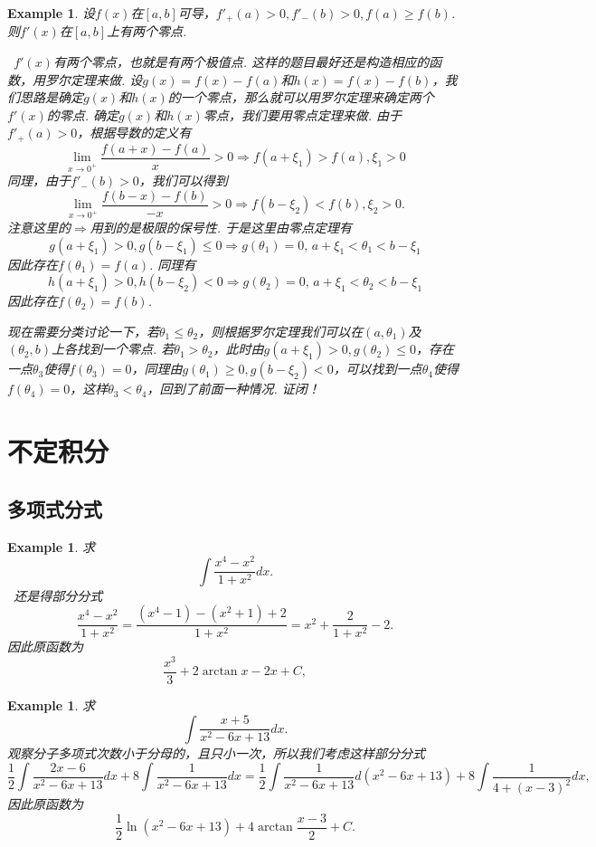 \documentclass{article}
\newtheorem{example}[theorem]{Example}
\newcommand{\hints}{{\color{blue} \text{hints}}}
\begin{document}
\begin{example}
\rm 设$f(x)$在$[a,b]$可导，$f'_+(a) > 0, f'_-(b) > 0, f(a) \geq f(b)$. 则$f'(x)$在$[a,b]$上有两个零点. 

\hints\ $f'(x)$有两个零点，也就是有两个极值点. 这样的题目最好还是构造相应的函数，用罗尔定理来做. 设$g(x) = f(x)-f(a)$和$h(x)=f(x)-f(b)$，我们思路是确定$g(x)$和$h(x)$的一个零点，那么就可以用罗尔定理来确定两个$f'(x)$的零点. 确定$g(x)$和$h(x)$零点，我们要用零点定理来做. 由于$f'_+(a) > 0$，根据导数的定义有
$$
\lim\limits_{x \to 0^+} \frac{f(a+x)-f(a)}{x} > 0 \Rightarrow f(a + \xi_1) > f(a),\xi_1 > 0
$$  
同理，由于$f'_-(b) > 0$，我们可以得到
$$
\lim\limits_{x \to 0^+} \frac{f(b-x)-f(b)}{-x} > 0 \Rightarrow f(b - \xi_2) < f(b), \xi_2 > 0.
$$
注意这里的$\Rightarrow$用到的是极限的保号性. 于是这里由零点定理有
$$
g(a + \xi_1) > 0, g(b-\xi_1) \leq 0 \Rightarrow g(\theta_1) = 0, \,a+\xi_1 < \theta_1 < b-\xi_1
$$
因此存在$f(\theta_1) = f(a)$. 同理有
$$
h(a+\xi_1) > 0, h(b-\xi_2) < 0 \Rightarrow g(\theta_2) = 0, \,a+\xi_1 < \theta_2 < b-\xi_1
$$
因此存在$f(\theta_2) = f(b)$.  

现在需要分类讨论一下，若$\theta_1  \leq \theta_2$，则根据罗尔定理我们可以在$(a,\theta_1)$及$(\theta_2,b)$上各找到一个零点. 若$\theta_1 > \theta_2$，此时由$g(a+\xi_1) > 0, g(\theta_2) \leq 0$，存在一点$\theta_3$使得$f(\theta_3) = 0$，同理由$g(\theta_1) \geq 0, g(b-\xi_2) < 0$，可以找到一点$\theta_4$使得$f(\theta_4) = 0$，这样$\theta_3 < \theta_4$，回到了前面一种情况. 证闭！


\end{example}


\newpage
\section{不定积分}

\subsection{多项式分式}

\begin{example}
\rm 求
$$
\int \frac{x^4-x^2}{1+x^2}dx.
$$
\hints\ 还是得部分分式
$$
\frac{x^4-x^2}{1+x^2} = \frac{(x^4-1) -(x^2+1) + 2 }{1+x^2}
= x^2 + \frac{2}{1+x^2}-2.
$$
因此原函数为
$$
\frac{x^3}{3} + 2\arctan x - 2x + C,
$$ 
\end{example}

\begin{example}
\rm 求
$$
\int \frac{x+5}{x^2-6x+13}dx.
$$
\hints 观察分子多项式次数小于分母的，且只小一次，所以我们考虑这样部分分式
$$
\frac{1}{2}\int \frac{2x-6}{x^2-6x+13}dx + 8\int \frac{1}{x^2-6x+13}dx = \frac{1}{2}\int \frac{1}{x^2-6x+13}d(x^2-6x+13) + 8\int \frac{1}{4+(x-3)^2}dx,
$$
因此原函数为
$$
\frac{1}{2}\ln(x^2-6x+13) +  4\arctan \frac{x-3}{2} +C.
$$
\end{example}
\end{document}
